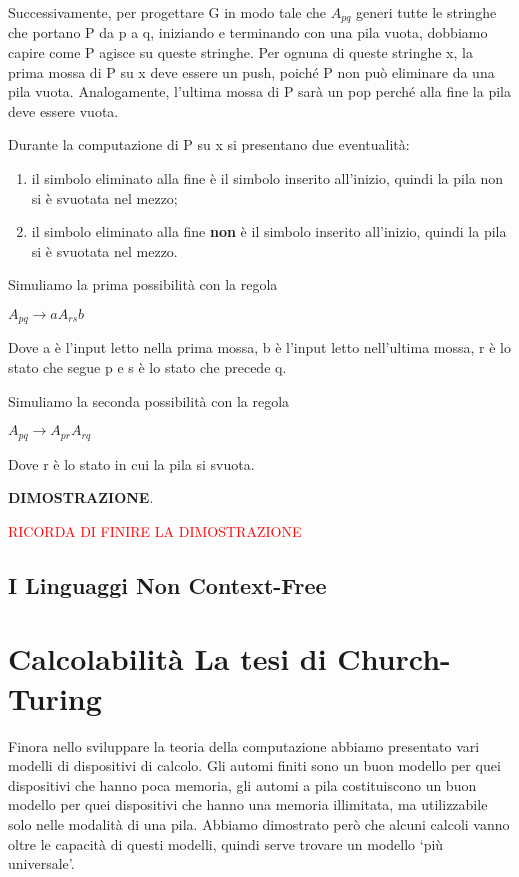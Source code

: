 \documentclass{article}
\begin{document}
Successivamente, per progettare G in modo tale che $A_{pq}$ generi tutte le
stringhe che portano P da p a q, iniziando e terminando con una pila vuota,
dobbiamo capire come P agisce su queste stringhe. Per ognuna di queste stringhe
x, la prima mossa di P su x deve essere un push, poiché P non può eliminare da
una pila vuota. Analogamente, l'ultima mossa di P sarà un pop perché alla fine
la pila deve essere vuota.

Durante la computazione di P su x si presentano due eventualità:

\begin{enumerate}
    \item il simbolo eliminato alla fine è il simbolo inserito all'inizio,
    quindi la pila non si è svuotata nel mezzo;
    \item il simbolo eliminato alla fine \textbf{non} è il simbolo inserito
    all'inizio, quindi la pila si è svuotata nel mezzo.
\end{enumerate}

Simuliamo la prima possibilità con la regola

\begin{center}
    $A_{pq} \rightarrow aA_{rs}b$
\end{center}

Dove a è l'input letto nella prima mossa, b è l'input letto nell'ultima mossa, r
è lo stato che segue p e s è lo stato che precede q.

Simuliamo la seconda possibilità con la regola

\begin{center}
    $A_{pq} \rightarrow A_{pr}A_{rq}$
\end{center}

Dove r è lo stato in cui la pila si svuota.

\textbf{DIMOSTRAZIONE}. 

\textcolor{red}{RICORDA DI FINIRE LA DIMOSTRAZIONE}

\subsection{I Linguaggi Non Context-Free}

\section{Calcolabilità \- La tesi di Church-Turing}

Finora nello sviluppare la teoria della computazione abbiamo presentato vari
modelli di dispositivi di calcolo. Gli automi finiti sono un buon modello per
quei dispositivi che hanno poca memoria, gli automi a pila costituiscono un buon
modello per quei dispositivi che hanno una memoria illimitata, ma utilizzabile
solo nelle modalità di una pila. Abbiamo dimostrato però che alcuni calcoli
vanno oltre le capacità di questi modelli, quindi serve trovare un modello `più
universale'.
\end{document}
